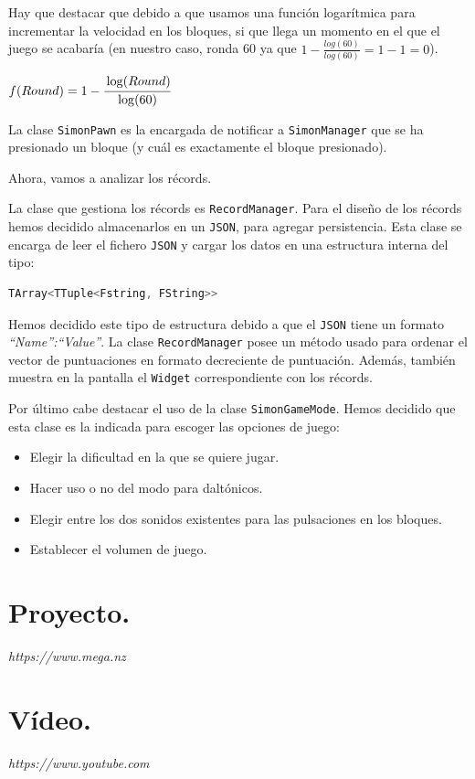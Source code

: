 \documentclass{article}
\begin{document}
Hay que destacar que debido a que usamos una función logarítmica para incrementar la velocidad en los bloques, si que llega un momento en el que el juego se acabaría (en nuestro caso, ronda 60 ya que $1 - \frac{log(60)}{log(60)} = 1 - 1 = 0$).

\begin{center}
$ f(Round) = 1 - \cfrac{\log(Round)}{\log(60)}$ 
\end{center}
\vspace*{0.15in}

La clase \texttt{SimonPawn} es la encargada de notificar a \texttt{SimonManager} que se ha presionado un bloque (y cuál es exactamente el bloque presionado).

\vspace*{0.15in}

Ahora, vamos a analizar los récords.

La clase que gestiona los récords es \texttt{RecordManager}. Para el diseño de los récords hemos decidido almacenarlos en un \texttt{JSON}, para agregar persistencia. Esta clase se encarga de leer el fichero \texttt{JSON} y cargar los datos en una estructura interna del tipo:

\begin{lstlisting}[language=C++]
TArray<TTuple<Fstring, FString>>
\end{lstlisting}

Hemos decidido este tipo de estructura debido a que el \texttt{JSON} tiene un formato \textit{``Name'':``Value''}. La clase \texttt{RecordManager} posee un método usado para ordenar el vector de puntuaciones en formato decreciente de puntuación. Además, también muestra en la pantalla el \texttt{Widget} correspondiente con los récords.

\vspace*{0.15in}

Por último cabe destacar el uso de la clase \texttt{SimonGameMode}. Hemos decidido que esta clase es la indicada para escoger las opciones de juego:

\begin{itemize}
\item Elegir la dificultad en la que se quiere jugar.
\item Hacer uso o no del modo para daltónicos.
\item Elegir entre los dos sonidos existentes para las pulsaciones en los bloques.
\item Establecer el volumen de juego.
\end{itemize}
\section{Proyecto.}

\textsl{https://www.mega.nz}

\section{Vídeo.}

\textsl{https://www.youtube.com}
\end{document}
